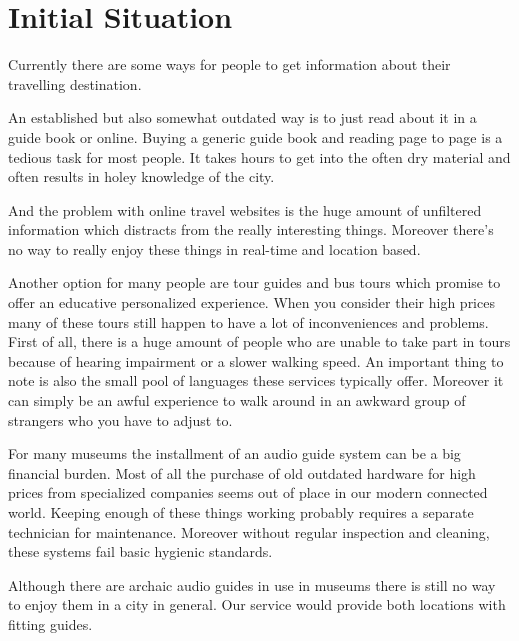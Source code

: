 \documentclass[12pt]{article}
\theoremstyle{definition}
\newenvironment{text}{
}{}
\begin{document}
\section{Initial Situation}
\begin{text}
Currently there are some ways for people to get information about their travelling destination.\newline

An established but also somewhat outdated way is to just read about it in a guide book or online.
Buying a generic guide book and
reading page to page is a tedious task for most people. It takes hours to get into the often dry material and often results in holey knowledge of the city.\newline

And the problem with online travel websites is the huge amount of unfiltered information which distracts from the really interesting things. Moreover there's no way to really enjoy these things in real-time and location based.\newline
 
Another option for many people are tour guides and bus tours which promise to offer an educative personalized experience. %
When you consider their high prices many of these tours still happen to have a lot of inconveniences and problems. First of all, there is a huge amount of people who are unable to take part in tours because of hearing impairment or a slower walking speed. An important thing to note is also the small pool of languages these services typically offer. Moreover it can simply be an awful experience to walk around in an awkward group of strangers who you have to adjust to.\newline
 
For many museums the installment of an audio guide system can be a big financial burden. Most of all the purchase of old outdated hardware for high prices from specialized companies seems out of place in our modern connected world. Keeping enough of these things working probably requires a separate technician for maintenance.
Moreover without regular inspection and cleaning, these systems fail basic hygienic standards. \newline

Although there are archaic audio guides in use in museums there is still no way to enjoy them in a city in general. Our service would provide both locations with fitting guides.
 
\end{text}
 
\end{document}
